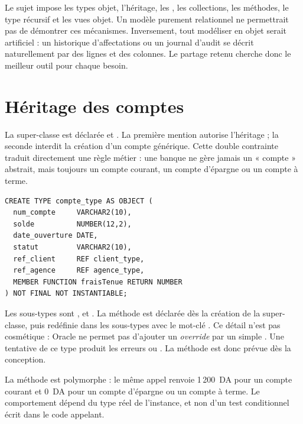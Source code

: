 \begin{remarquebox}
Le sujet impose les types objet, l'héritage, les , les collections,
les méthodes, le type récursif et les vues objet. Un modèle purement
relationnel ne permettrait pas de démontrer ces mécanismes. Inversement, tout
modéliser en objet serait artificiel : un historique d'affectations ou un
journal d'audit se décrit naturellement par des lignes et des colonnes. Le
partage retenu cherche donc le meilleur outil pour chaque besoin.
\end{remarquebox}

\section{Héritage des comptes}

La super-classe  est déclarée  et
. La première mention autorise l'héritage ; la seconde
interdit la création d'un compte générique. Cette double contrainte traduit
directement une règle métier : une banque ne gère jamais un « compte » abstrait,
mais toujours un compte courant, un compte d'épargne ou un compte à terme.

\begin{lstlisting}[caption={Déclaration de la super-classe \code{compte\_type}.},label={lst:compte-type}]
CREATE TYPE compte_type AS OBJECT (
  num_compte     VARCHAR2(10),
  solde          NUMBER(12,2),
  date_ouverture DATE,
  statut         VARCHAR2(10),
  ref_client     REF client_type,
  ref_agence     REF agence_type,
  MEMBER FUNCTION fraisTenue RETURN NUMBER
) NOT FINAL NOT INSTANTIABLE;
\end{lstlisting}

Les sous-types sont ,  et
. La méthode  est déclarée dès la
création de la super-classe, puis redéfinie dans les sous-types avec le mot-clé
. Ce détail n'est pas cosmétique : Oracle ne permet pas
d'ajouter un \emph{override} par un simple .
Une tentative de ce type produit les erreurs  ou
. La méthode est donc prévue dès la conception.

\begin{attentionbox}
La méthode  est polymorphe : le même appel
 renvoie 1\,200~DA pour un compte courant et 0~DA pour un
compte d'épargne ou un compte à terme. Le comportement dépend du type réel de
l'instance, et non d'un test conditionnel écrit dans le code appelant.
\end{attentionbox}

